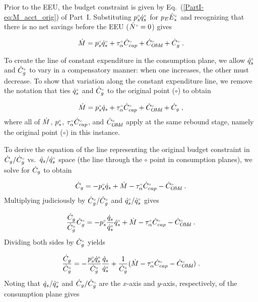 Prior to the EEU, the budget constraint is given by Eq.~(\ref{PartI-eq:M_acct_orig}) of Part~I.
Substituting $\orig{p}_s \rorig{q}_s$ for $p_E \rorig{E}_s$ and 
recognizing that there is no net savings before the EEU
($\rorig{N} = 0$) gives

\begin{equation}
  \rate{M} = \orig{p}_s \rorig{q}_s + \orig{\tau}_\alpha \rorig{C}_{cap} + \rorig{C}_{\omd} + \rorig{C}_g \; .
\end{equation}

To create the line of constant expenditure in the consumption plane, 
we allow $\rorig{q}_s$ and $\rorig{C}_g$ to vary in a compensatory manner:
when one increases, the other must decrease.
To show that variation along the constant expenditure line, 
we remove the notation that ties $\rorig{q}_s$ and $\rorig{C}_g$
to the original point ($\circ$) to obtain

\begin{equation}
  \rate{M} = \bempl{p}_s \rate{q}_s + \bempl{\tau}_\alpha \rbempl{C}_{cap} + \rbempl{C}_{\omd} + \rate{C}_g \; , 
\end{equation}
%
where all of $\rate{M}$, $\bempl{p}_s$, $\bempl{\tau}_\alpha \rbempl{C}_{cap}$, and $\rbempl{C}_{\omd}$
apply at the same rebound stage, 
namely the original point ($\circ$) in this instance.

To derive the equation of the line representing the original budget constraint 
in $\rate{C}_g/\rbempl{C}_g$ vs.\ $\rate{q}_s/\rbempl{q}_s$ space
(the \circcirc{} line through the $\circ$ point
in consumption planes), 
we solve for $\rate{C}_g$ to obtain

\begin{equation}
  \rate{C}_g = - \bempl{p}_s \rate{q}_s + \rate{M} - \bempl{\tau}_\alpha \rbempl{C}_{cap} - \rbempl{C}_{\omd} \; .
\end{equation}
%
Multiplying judiciously by $\rbempl{C}_g/\rbempl{C}_g$ and $\rbempl{q}_s/\rbempl{q}_s$ gives

\begin{equation}
  \frac{\rate{C}_g}{\rbempl{C}_g} \rbempl{C}_g
       = - \bempl{p}_s \frac{\rate{q}_s}{\rbempl{q}_s} \rbempl{q}_s 
         + \rate{M} - \bempl{\tau}_\alpha \rbempl{C}_{cap} - \rbempl{C}_{\omd} \; .
\end{equation}
%
Dividing both sides by $\rbempl{C}_g$ yields

\begin{equation}
  \frac{\rate{C}_g}{\rbempl{C}_g}
       = - \frac{\bempl{p}_s \rbempl{q}_s}{\rbempl{C}_g} \frac{\rate{q}_s}{\rbempl{q}_s}
         + \frac{1}{\rbempl{C}_g} (\rate{M} - \bempl{\tau}_\alpha \rbempl{C}_{cap} - \rbempl{C}_{\omd}) \; .
\end{equation}
%
Noting that  
$\rate{q}_s/\rbempl{q}_s$ and 
$\rate{C}_g/\rbempl{C}_g$ are
the $x$-axis and $y$-axis, respectively,
of the consumption plane gives

